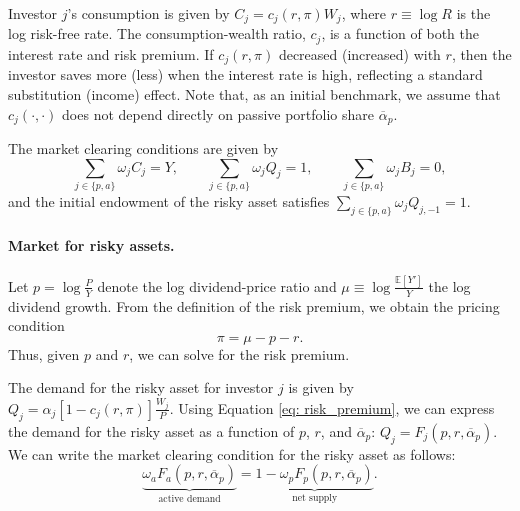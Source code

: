 Investor $j$'s consumption is given by $ C_j = c_{j}( r , \pi) W_j$, where $r \equiv \log R$ is the log risk-free rate. The consumption-wealth ratio, $c_j$, is a function of both the interest rate and risk premium. 
If $c_{j}(r, \pi)$ decreased (increased) with $r$, then the investor saves more (less) when the interest rate is high, reflecting a standard substitution (income) effect.
Note that, as an initial benchmark, we assume that $c_j(\cdot, \cdot)$ does not depend directly on passive portfolio share $\overline{\alpha}_p$.

The market clearing conditions are given by
\begin{equation}
    \sum_{j\in\{p,a\}} \omega_j C_j = Y, \qquad 
    \sum_{j\in\{p,a\}} \omega_j Q_j = 1, \qquad 
    \sum_{j\in\{p,a\}} \omega_j B_j = 0,\nonumber
\end{equation}
and the initial endowment of the risky asset satisfies $\sum_{j\in\{p,a\}} \omega_j Q_{j,-1} = 1$.

\paragraph{Market for risky assets.} Let $p = \log \frac{P}{Y}$ denote the log dividend-price ratio and $\mu \equiv \log \frac{\mathbb{E}[Y']}{Y}$ the log dividend growth. From the definition of the risk premium, we obtain the pricing condition
\begin{equation}\label{eq: risk_premium}
    \pi = \mu - p - r.
\end{equation}
Thus, given $p$ and $r$, we can solve for the risk premium. 

The demand for the risky asset for investor $j$ is given by $Q_j = \alpha_j [1 - c_{j}(r,\pi)]\frac{W_j}{P}$. Using Equation \eqref{eq: risk_premium}, we can express the demand for the risky asset as a function of $p$, $r$, and $\overline{\alpha}_p$: $Q_j = F_j(p, r, \overline{\alpha}_p)$.  
We can write the market clearing condition for the risky asset as follows:
\begin{equation}\label{eq: risky_mkt}
\underbrace{\omega_a F_a(p, r, \overline{\alpha}_p)}_{\text{active demand}}  = \underbrace{1 - \omega_p  F_p(p, r, \overline{\alpha}_p)}_{\text{net supply}}.
\end{equation}


